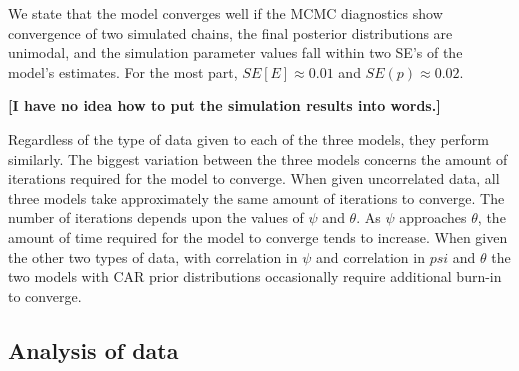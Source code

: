 \documentclass[11pt]{article}
\begin{document}
    We state that the model converges well if the MCMC diagnostics show
    convergence of two simulated chains, the final posterior distributions are
    unimodal, and the simulation parameter values fall within two SE's of the
    model's estimates.  For the most part, \(SE[E] \approx 0.01\) and \(SE(p)
    \approx 0.02\).

    \textbf{[I have no idea how to put the simulation results into words.]}

    Regardless of the type of data given to each of the three models, they
    perform similarly.  The biggest variation between the three models concerns
    the amount of iterations required for the model to converge.  When given
    uncorrelated data, all three models take approximately the same amount of
    iterations to converge.  The number of iterations depends upon the values
    of \(\psi\) and \(\theta\).  As \(\psi\) approaches \(\theta\), the amount
    of time required for the model to converge tends to increase.  When given
    the other two types of data, with correlation in \(\psi\) and correlation
    in \(psi\) and \(\theta\) the two models with CAR prior distributions
    occasionally require additional burn-in to converge.

    \subsection{Analysis of data}
\end{document}
